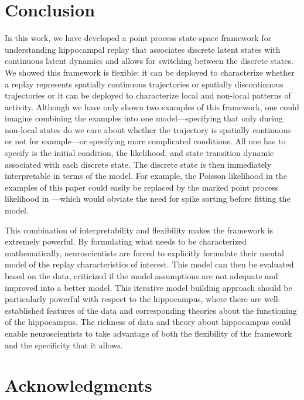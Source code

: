 \documentclass[conference]{IEEEtran}
\begin{document}
\section{Conclusion}
In this work, we have developed a point process state-space framework for understanding hippocampal replay that associates discrete latent states with continuous latent dynamics and allows for switching between the discrete states. We showed this framework is flexible: it can be deployed to characterize whether a replay represents spatially continuous trajectories or spatially discontinuous trajectories or it can be deployed to characterize local and non-local patterns of activity. Although we have only shown two examples of this framework, one could imagine combining the examples into one model---specifying that only during non-local states do we care about whether the trajectory is spatially continuous or not for example---or specifying more complicated conditions. All one has to specify is the initial condition, the likelihood, and state transition dynamic associated with each discrete state. The discrete state is then immediately interpretable in terms of the model. For example, the Poisson likelihood in the examples of this paper could easily be replaced by the marked point process likelihood in \cite{DengRapidclassificationhippocampal2016}---which would obviate the need for spike sorting before fitting the model.

This combination of interpretability and flexibility makes the framework is extremely powerful. By formulating what needs to be characterized mathematically, neuroscientists are forced to explicitly formulate their mental model of the replay characteristics of interest. This model can then be evaluated based on the data, criticized if the model assumptions are not adequate and improved into a better model. This iterative model building approach should be particularly powerful with respect to the hippocampus, where there are well-established features of the data and corresponding theories about the functioning of the hippocampus. The richness of data and theory about hippocampus could enable neuroscientists to take advantage of both the flexibility of the framework and the specificity that it allows.


\section*{Acknowledgments}
\printbibliography
\end{document}
